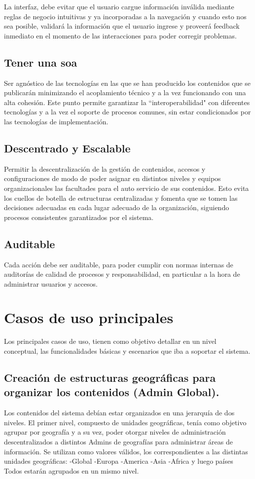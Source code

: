 La interfaz, debe evitar que el usuario cargue información inválida mediante reglas de negocio intuitivas y ya incorporadas a la navegación y cuando esto nos sea posible, validará la información que el usuario ingrese y proveerá feedback inmediato en el momento de las interacciones para poder corregir problemas.

\subsection{Tener una \Gls{soa}}
\label{principios:soa}
Ser agnóstico de las tecnologías en las que se han producido los contenidos que se publicarán minimizando el acoplamiento técnico y a la vez funcionando con una alta cohesión. Este punto permite garantizar la “interoperabilidad" con diferentes tecnologías y a la vez el soporte de procesos comunes, sin estar condicionados por las tecnologías de implementación.

\subsection{Descentrado y Escalable}
\label{principios:federado}
Permitir la descentralización de la gestión de contenidos, accesos y configuraciones de modo de poder asignar en distintos niveles y equipos organizacionales las facultades para el auto servicio de sus contenidos. Esto evita los cuellos de botella de estructuras centralizadas y fomenta que se tomen las decisiones adecuadas en cada lugar adecuado de la organización, siguiendo procesos consistentes garantizados por el sistema.

\subsection{Auditable}
\label{princpipios:auditable}
Cada acción debe ser auditable, para poder cumplir con normas internas de auditorías de calidad de procesos y responsabilidad, en particular a la hora de administrar usuarios y accesos.

\section{Casos de uso principales}
Los principales casos de uso, tienen como objetivo detallar en un nivel conceptual, las funcionalidades básicas y escenarios que iba a soportar el sistema. 

\subsection{Creación de estructuras geográficas para organizar los contenidos (Admin Global).}
Los contenidos del sistema debían estar organizados en una jerarquía de dos niveles. El primer nivel, compuesto de unidades geográficas, tenía como objetivo agrupar por geografía y a su vez, poder otorgar niveles de administración descentralizados a distintos Admins de geografías para administrar áreas de información. Se utilizan como valores válidos, los correspondientes a las distintas unidades geográficas:
	-Global
	-Europa
	-America
	-Asia
	-Africa
	y luego países
	Todos estarán agrupados en un mismo nivel.

